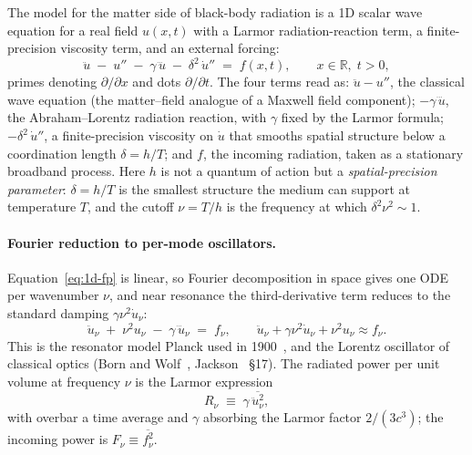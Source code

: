 The model for the matter side of black-body radiation is a 1D scalar wave equation for a real field $u(x,t)$ with a Larmor radiation-reaction term, a finite-precision viscosity term, and an external forcing:
\begin{equation}\label{eq:1d-fp}
\ddot u \;-\; u'' \;-\; \gamma\, \dddot u \;-\; \delta^2\, \dot u'' \;=\; f(x, t),
\qquad x \in \mathbb{R},\; t > 0,
\end{equation}
primes denoting $\partial/\partial x$ and dots $\partial/\partial t$. The four terms read as: $\ddot u - u''$, the classical wave equation (the matter--field analogue of a Maxwell field component); $-\gamma\,\dddot u$, the Abraham--Lorentz radiation reaction, with $\gamma$ fixed by the Larmor formula; $-\delta^2\,\dot u''$, a finite-precision viscosity on $\dot u$ that smooths spatial structure below a coordination length $\delta = h/T$; and $f$, the incoming radiation, taken as a stationary broadband process. Here $h$ is not a quantum of action but a \emph{spatial-precision parameter}: $\delta = h/T$ is the smallest structure the medium can support at temperature $T$, and the cutoff $\nu = T/h$ is the frequency at which $\delta^2 \nu^2 \sim 1$.

\paragraph{Fourier reduction to per-mode oscillators.}
Equation~\eqref{eq:1d-fp} is linear, so Fourier decomposition in space gives one ODE per wavenumber $\nu$, and near resonance the third-derivative term reduces to the standard damping $\gamma\nu^2\dot u_\nu$:
\begin{equation}\label{eq:waveeq}
\ddot u_\nu \;+\; \nu^2 u_\nu \;-\; \gamma\, \dddot u_\nu \;=\; f_\nu,
\qquad
\ddot u_\nu + \gamma\nu^2 \dot u_\nu + \nu^2 u_\nu \approx f_\nu .
\end{equation}
This is the resonator model Planck used in 1900~\cite{Planck1900}, and the Lorentz oscillator of classical optics (Born and Wolf~\cite{BornWolf}, Jackson~\cite{Jackson} \S17). The radiated power per unit volume at frequency $\nu$ is the Larmor expression
\begin{equation}\label{eq:Rnu}
R_\nu \;\equiv\; \gamma\, \overline{\ddot u_\nu^2},
\end{equation}
with overbar a time average and $\gamma$ absorbing the Larmor factor $2/(3c^3)$; the incoming power is $F_\nu \equiv \overline{f_\nu^2}$.


